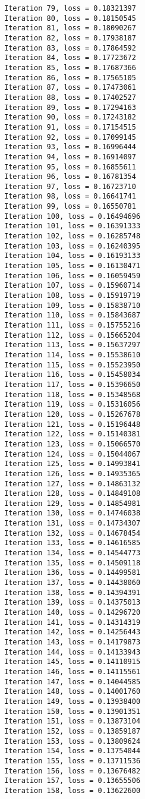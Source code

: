 \documentclass[11pt]{article}
\begin{document}
\begin{Verbatim}[commandchars=\\\{\}]
Iteration 79, loss = 0.18321397
Iteration 80, loss = 0.18150545
Iteration 81, loss = 0.18090267
Iteration 82, loss = 0.17938187
Iteration 83, loss = 0.17864592
Iteration 84, loss = 0.17723672
Iteration 85, loss = 0.17687366
Iteration 86, loss = 0.17565105
Iteration 87, loss = 0.17473061
Iteration 88, loss = 0.17402527
Iteration 89, loss = 0.17294163
Iteration 90, loss = 0.17243182
Iteration 91, loss = 0.17154515
Iteration 92, loss = 0.17099145
Iteration 93, loss = 0.16996444
Iteration 94, loss = 0.16914097
Iteration 95, loss = 0.16855611
Iteration 96, loss = 0.16781354
Iteration 97, loss = 0.16723710
Iteration 98, loss = 0.16641741
Iteration 99, loss = 0.16550781
Iteration 100, loss = 0.16494696
Iteration 101, loss = 0.16391333
Iteration 102, loss = 0.16285748
Iteration 103, loss = 0.16240395
Iteration 104, loss = 0.16193133
Iteration 105, loss = 0.16130471
Iteration 106, loss = 0.16059459
Iteration 107, loss = 0.15960714
Iteration 108, loss = 0.15919719
Iteration 109, loss = 0.15838710
Iteration 110, loss = 0.15843687
Iteration 111, loss = 0.15755216
Iteration 112, loss = 0.15665204
Iteration 113, loss = 0.15637297
Iteration 114, loss = 0.15538610
Iteration 115, loss = 0.15523950
Iteration 116, loss = 0.15458034
Iteration 117, loss = 0.15396650
Iteration 118, loss = 0.15348568
Iteration 119, loss = 0.15316056
Iteration 120, loss = 0.15267678
Iteration 121, loss = 0.15196448
Iteration 122, loss = 0.15140381
Iteration 123, loss = 0.15066570
Iteration 124, loss = 0.15044067
Iteration 125, loss = 0.14993841
Iteration 126, loss = 0.14935365
Iteration 127, loss = 0.14863132
Iteration 128, loss = 0.14849108
Iteration 129, loss = 0.14854981
Iteration 130, loss = 0.14746038
Iteration 131, loss = 0.14734307
Iteration 132, loss = 0.14678454
Iteration 133, loss = 0.14616585
Iteration 134, loss = 0.14544773
Iteration 135, loss = 0.14509118
Iteration 136, loss = 0.14499581
Iteration 137, loss = 0.14438060
Iteration 138, loss = 0.14394391
Iteration 139, loss = 0.14375013
Iteration 140, loss = 0.14296720
Iteration 141, loss = 0.14314319
Iteration 142, loss = 0.14256443
Iteration 143, loss = 0.14179873
Iteration 144, loss = 0.14133943
Iteration 145, loss = 0.14110915
Iteration 146, loss = 0.14115561
Iteration 147, loss = 0.14044585
Iteration 148, loss = 0.14001760
Iteration 149, loss = 0.13938400
Iteration 150, loss = 0.13901351
Iteration 151, loss = 0.13873104
Iteration 152, loss = 0.13859187
Iteration 153, loss = 0.13809624
Iteration 154, loss = 0.13754044
Iteration 155, loss = 0.13711536
Iteration 156, loss = 0.13676482
Iteration 157, loss = 0.13655506
Iteration 158, loss = 0.13622600

\end{Verbatim}
\end{document}
